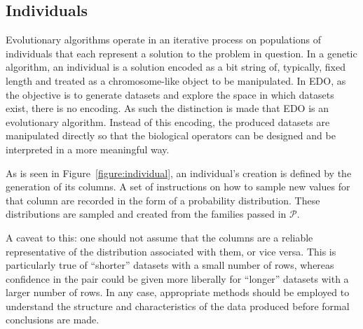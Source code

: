 \subsection{Individuals}

Evolutionary algorithms operate in an iterative process on populations of
individuals that each represent a solution to the problem in question. In a
genetic algorithm, an individual is a solution encoded as a bit string of,
typically, fixed length and treated as a chromosome-like object to be
manipulated. In EDO, as the objective is to generate datasets and explore the
space in which datasets exist, there is no encoding. As such the distinction is
made that EDO is an evolutionary algorithm. Instead of this encoding, the
produced datasets are manipulated directly so that the biological operators can
be designed and be interpreted in a more meaningful way.

As is seen in Figure~\ref{figure:individual}, an individual's creation
is defined by the generation of its columns. A set of instructions on how to
sample new values for that column are recorded in the form of a probability
distribution. These distributions are sampled and created from the families
passed in \(\mathcal{P}\).


A caveat to this: one should not assume that the columns are a reliable
representative of the distribution associated with them, or vice versa. This is
particularly true of ``shorter'' datasets with a small number of rows, whereas
confidence in the pair could be given more liberally for ``longer'' datasets
with a larger number of rows. In any case, appropriate methods should be
employed to understand the structure and characteristics of the data produced
before formal conclusions are made.



